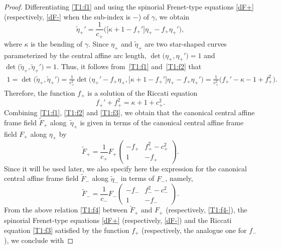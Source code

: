 \documentclass[10pt,a4paper]{amsart}
\numberwithin{equation}{section}
\def\bending{\kappa}
\begin{document}
\begin{proof}
	Differentiating \eqref{T1:f1} and using the spinorial Frenet-type equations \eqref{dF+} (respectively, \eqref{dF-} when the sub-index is $-$) of $\gamma$, we obtain
	\begin{equation}\label{T1:f2}
		\widetilde{\eta}_+'=\frac{1}{c_+}\bigl(\bigl[\bending+1-f_+'\bigr]\eta_+-f_+\eta_+'\bigr),
	\end{equation}
	where $\bending$ is the bending of $\gamma$. Since $\eta_+$ and $\widetilde{\eta}_+$ are two star-shaped curves parameterized by the central affine arc length, $\det \bigl(\eta_+,\eta_+'\bigr)=1$ and $\det \bigl(\widetilde{\eta}_+,\widetilde{\eta}_+'\bigr)=1$. Thus, it follows from~\eqref{T1:f1} and~\eqref{T1:f2} that
	\begin{align*}
		1=\det \bigl(\widetilde{\eta}_+,\widetilde{\eta}_+'\bigr) =\frac{1}{c_+^2}\det \bigl(\eta_+'-f_+\eta_+,\bigl[\bending+1-f_+'\bigr]\eta_+-f_+\eta_+'\bigr)
		 =\frac{1}{c_+^2}\bigl(f_+'-\bending-1+f_+^2\bigr).
	\end{align*}
	Therefore, the function $f_+$ is a solution of the Riccati equation
	\begin{equation}\label{T1:f3}
		f_+'+f_+^2=\bending+1+c_+^2.
	\end{equation}
	Combining \eqref{T1:f1}, \eqref{T1:f2} and \eqref{T1:f3}, we obtain that the canonical central affine frame field $\widetilde{F}_+$ along~$\widetilde{\eta}_+$ is given in terms of the canonical central affine frame field $F_+$ along $\eta_+$ by
	\begin{equation}\label{T1:f4}
		\widetilde{F}_+=\frac{1}{c_+}F_+\begin{pmatrix} -f_+ & f_+^2-c_+^2 \\ 1 & -f_+\end{pmatrix}.
	\end{equation}
	Since it will be used later, we also specify here the expression for the canonical central affine frame field $\widetilde{F}_-$ along $\widetilde{\eta}_-$ in terms of $F_-$, namely,
	\begin{equation}\label{T1:f4-}
		\widetilde{F}_-=\frac{1}{c_-}F_-\begin{pmatrix} -f_- & f_-^2-c_-^2 \\ 1 & -f_-\end{pmatrix}.
	\end{equation}
	From the above relation \eqref{T1:f4} between $\widetilde{F}_+$ and $F_+$ (respectively, \eqref{T1:f4-}), the spinorial Frenet-type equations \eqref{dF+} (respectively, \eqref{dF-}) and the Riccati equation \eqref{T1:f3} satisfied by the function $f_+$ (respectively, the analogue one for $f_-$), we conclude with

\end{proof}
\end{document}

